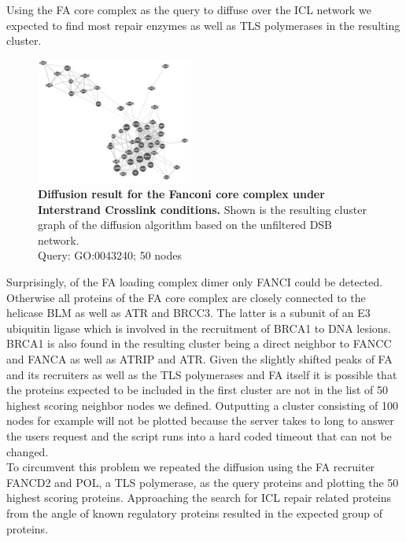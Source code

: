 Using the FA core complex as the query to diffuse over the ICL network we expected to find most repair enzymes as well as TLS polymerases in the resulting cluster.
\begin{figure}
    \includegraphics[width=0.46\textwidth]{resources/images/Results/FAcore_diff_ICL_50.PNG}
    \caption[Diffusion result for the Fanconi core complex under Interstrand Crosslink conditions]{\textbf{Diffusion result for the Fanconi core complex under Interstrand Crosslink conditions. }Shown is the resulting cluster graph of the diffusion algorithm based on the unfiltered DSB network.\\Query: GO:0043240; 50 nodes}
    \label{fig:atrtarget_diff_fc}
\end{figure}
Surprisingly, of the FA loading complex dimer only FANCI could be detected. Otherwise all proteins of the FA core complex are closely connected to the helicase BLM as well as ATR and BRCC3. The latter is a subunit of an E3 ubiquitin ligase which is involved in the recruitment of BRCA1 to DNA lesions. BRCA1 is also found in the resulting cluster being a direct neighbor to FANCC and FANCA as well as ATRIP and ATR. Given the slightly shifted peaks of FA and its recruiters as well as the TLS polymerases and FA itself it is possible that the proteins expected to be included in the first cluster are not in the list of 50 highest scoring neighbor nodes we defined. Outputting a cluster consisting of 100 nodes for example will not be plotted because the server takes to long to answer the users request and the script runs into a hard coded timeout that can not be changed.\\
To circumvent this problem we repeated the diffusion using the FA recruiter FANCD2 and POL\textkappa, a TLS polymerase, as the query proteins and plotting the 50 highest scoring proteins. Approaching the search for ICL repair related proteins from the angle of known regulatory proteins resulted in the expected group of proteins. 
